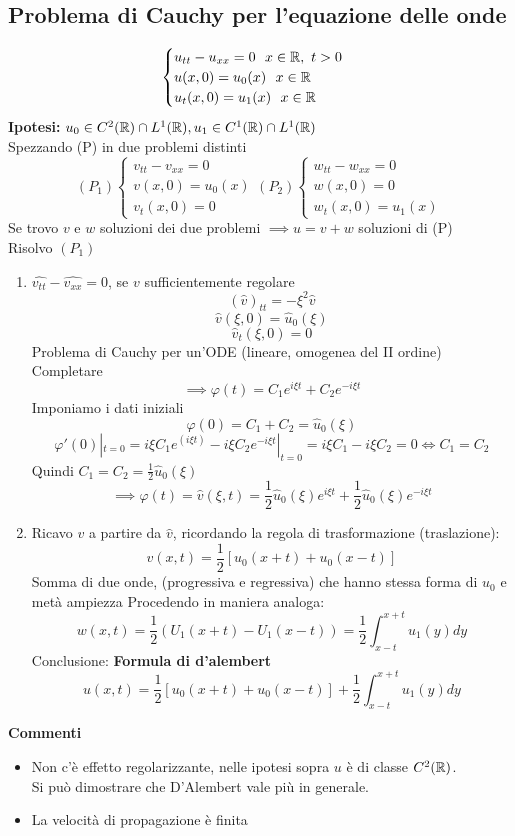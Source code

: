 \subsection{Problema di Cauchy per l'equazione delle onde}
\[\begin{cases}
	u_{t t}-u_{x x}=0\ \ x\in \mathbb{R},\ t>0\\
	u(x,0)=u_0(x)\ \ x\in \mathbb{R}
	\\u_t(x,0)=u_1(x)\ \ x\in \mathbb{R}
\end{cases}\]
\textbf{Ipotesi:} $u_0\in C^2(\mathbb{R})\cap L^{1}(\mathbb{R}),u_1\in C^1(\mathbb{R})\cap L^{1}(\mathbb{R})$
\\Spezzando (P) in due problemi distinti
\[(P_1) \begin{cases}
	v_{t t}-v_{x x}=0\\
	v(x,0)=u_0(x)\\
	v_t(x,0)=0
\end{cases}
(P_2) \begin{cases}
	w_{t t}-w_{x x}=0\\
	w(x,0)=0\\
	w_t(x,0)=u_1(x)
\end{cases}\]
Se trovo $v$ e $w$ soluzioni dei due problemi $\implies u=v+w$ soluzioni di (P)
\\Risolvo $(P_1)$ 
\begin{enumerate}
	\item $\widehat{v_{t t}}-\widehat{v_{x x}}=0$, se $v$ sufficientemente regolare
		\[(\hat{v})_{t t}=-\xi^2 \hat{v}\]
		\[\hat{v}(\xi,0)=\hat{u}_0(\xi)\]
		\[\hat{v}_t(\xi,0)=0\]
		Problema di Cauchy per un'ODE (lineare, omogenea del II ordine)
		Completare
		\[\implies \varphi(t)=C_1e^{i\xi t}+C_2e^{-i\xi t}\]
		Imponiamo i dati iniziali 
		\[\varphi(0)=C_1+C_2=\hat{u}_0(\xi)\]
		\[\varphi'(0)|_{t=0}=i\xi C_1e^{(i\xi t)}-i\xi C_2e^{-i\xi t}|_{t=0}=i\xi C_1-i\xi C_2=0 \iff C_1=C_2\]
		Quindi $C_1=C_2=\frac{1}{2}\hat{u}_0(\xi)$ 
		\[\implies \varphi(t)=\hat{v}(\xi,t)=\frac{1}{2}\hat{u}_0(\xi)e^{i\xi t}+\frac{1}{2}\hat{u}_0(\xi)e^{-i\xi t}\]
	\item Ricavo $v$ a partire da $\hat{v}$, ricordando la regola di trasformazione (traslazione):
		\[v(x,t)=\frac{1}{2}[u_0(x+t)+u_0(x-t)]\]
		Somma di due onde, (progressiva e regressiva) che hanno stessa forma di $u_0$ e metà ampiezza
		Procedendo in maniera analoga:
		\[w(x,t)=\frac{1}{2}(U_1(x+t)-U_1(x-t))=\frac{1}{2}\int_{x-t}^{x+t} u_1(y)dy\]
		Conclusione: \textbf{Formula di d'alembert}
		\[u(x,t)=\frac{1}{2}[u_0(x+t)+u_0(x-t)]+\frac{1}{2} \int_{x-t}^{x+t} u_1(y)dy\]


\end{enumerate}
\textbf{Commenti} 
\begin{itemize}
	\item Non c'è effetto regolarizzante, nelle ipotesi sopra $u$ è di classe $C^2(\mathbb{R})$.
		\\Si può dimostrare che D'Alembert vale più in generale.
	\item La velocità di propagazione è finita


\end{itemize}


